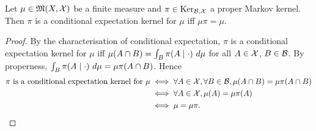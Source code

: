 \begin{lemma}
    \label{lem:cond-exp-proper-ker-bind}
    \leanok

    Let $\mu\in\mathfrak{M}(X,\mathcal{X})$ be a finite measure and $\pi\in\text{Ker}_{\mathcal{B},\mathcal{X}}$ a
    proper Markov kernel. Then $\pi$ is a conditional expectation kernel for $\mu$ iff
    $\mu\pi = \mu$.
\end{lemma}
\begin{proof}
    \leanok

    By the characterisation of conditional expectation, $\pi$ is a conditional expectation
    kernel for $\mu$ iff $\mu(A \inter B) = \int_B \pi(A\mid\cdot)\ d\mu$ for all $A \in \mathcal{X}$,
    $B \in \mathcal{B}$. By properness, $\int_B \pi(A\mid\cdot)\ d\mu = \mu\pi(A \cap B)$. Hence
    \begin{align}
        \pi \text{ is a conditional expectation kernel for }\mu
        & \iff \forall A \in \mathcal{X}, \forall B \in \mathcal{B}, \mu(A \cap B) = \mu\pi(A \cap B) \\
        & \iff \forall A \in \mathcal{X}, \mu(A) = \mu\pi(A) \\
        & \iff \mu = \mu\pi.
    \end{align}
\end{proof}
